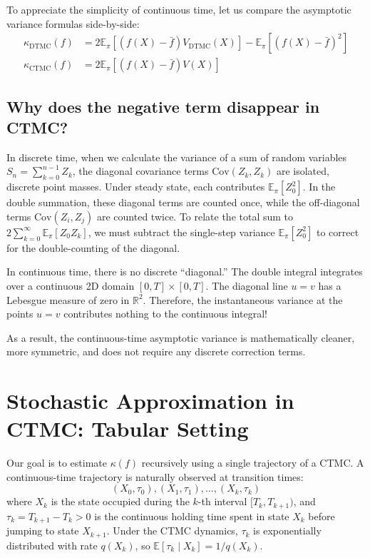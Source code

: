 \documentclass[11pt]{article}
\begin{document}
To appreciate the simplicity of continuous time, let us compare the asymptotic variance formulas side-by-side:
\begin{align}
    \kappa_{\text{DTMC}}(f) &= 2 \mathbb{E}_\pi [ (f(X) - \bar{f}) V_{\text{DTMC}}(X) ] - \mathbb{E}_\pi [ (f(X) - \bar{f})^2 ] \label{eq:dtmc_kappa} \\
    \kappa_{\text{CTMC}}(f) &= 2 \mathbb{E}_\pi [ (f(X) - \bar{f}) V(X) ] \label{eq:ctmc_kappa}
\end{align}

\subsection*{Why does the negative term disappear in CTMC?}
In discrete time, when we calculate the variance of a sum of random variables $S_n = \sum_{k=0}^{n-1} Z_k$, the diagonal covariance terms $\text{Cov}(Z_k, Z_k)$ are isolated, discrete point masses. Under steady state, each contributes $\mathbb{E}_\pi[Z_0^2]$. In the double summation, these diagonal terms are counted once, while the off-diagonal terms $\text{Cov}(Z_i, Z_j)$ are counted twice. To relate the total sum to $2 \sum_{k=0}^\infty \mathbb{E}_\pi[Z_0 Z_k]$, we must subtract the single-step variance $\mathbb{E}_\pi[Z_0^2]$ to correct for the double-counting of the diagonal.

In continuous time, there is no discrete ``diagonal.'' The double integral integrates over a continuous 2D domain $[0, T] \times [0, T]$. The diagonal line $u = v$ has a Lebesgue measure of zero in $\mathbb{R}^2$. Therefore, the instantaneous variance at the points $u = v$ contributes nothing to the continuous integral! 

As a result, the continuous-time asymptotic variance is mathematically cleaner, more symmetric, and does not require any discrete correction terms.

\section{Stochastic Approximation in CTMC: Tabular Setting}

Our goal is to estimate $\kappa(f)$ recursively using a single trajectory of a CTMC. A continuous-time trajectory is naturally observed at transition times:
\begin{equation}
    (X_0, \tau_0), (X_1, \tau_1), \dots, (X_k, \tau_k)
\end{equation}
where $X_k$ is the state occupied during the $k$-th interval $[T_k, T_{k+1})$, and $\tau_k = T_{k+1} - T_k > 0$ is the continuous holding time spent in state $X_k$ before jumping to state $X_{k+1}$. Under the CTMC dynamics, $\tau_k$ is exponentially distributed with rate $q(X_k)$, so $\mathbb{E}[\tau_k \mid X_k] = 1/q(X_k)$.
\end{document}
